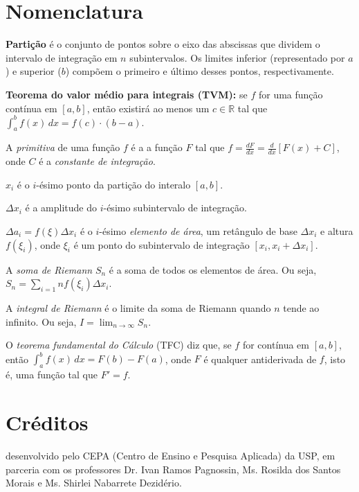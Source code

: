 \documentclass[a4paper,12pt]{scrartcl}
\begin{document}
\section*{Nomenclatura}
\begin{compactitem}
 \item {\bfseries Partição} é o conjunto de pontos sobre o eixo das abscissas que dividem o intervalo de integração em $n$ subintervalos. Os limites inferior (representado por $a$) e superior ($b$) compõem o primeiro e último desses pontos, respectivamente.
 
 \item {\bfseries Teorema do valor médio para integrais (TVM):} se $f$ for uma função contínua em $[a,b]$, então existirá ao menos um $c \in \mathbb{R}$ tal que $\int_a^b f(x)\,dx = f(c)\cdot(b-a)$.
 
 \item A \emph{primitiva} de uma função $f$ é a a função $F$ tal que $f = \frac{dF}{dx} = \frac{d}{dx}\left[F(x) + C\right]$, onde $C$ é a \emph{constante de integração}.
 
 \item $x_i$ é o $i$-ésimo ponto da partição do interalo $[a,b]$.
 
 \item $\Delta x_i$ é a amplitude do $i$-ésimo subintervalo de integração.
 
 \item $\Delta a_i = f(\xi) \Delta x_i$ é o $i$-ésimo \emph{elemento de área}, um retângulo de base $\Delta x_i$ e altura $f(\xi_i)$, onde $\xi_i$ é um ponto do subintervalo de integração $[x_i, x_i + \Delta x_i]$.
 
 \item A \emph{soma de Riemann} $S_n$ é a soma de todos os elementos de área. Ou seja, $S_n = \sum_{i=1}{n} f(\xi_i) \Delta x_i$.
 
 \item A \emph{integral de Riemann} é o limite da soma de Riemann quando $n$ tende ao infinito. Ou seja, $I = \lim_{n \to \infty} S_n$.
 
 \item O \emph{teorema fundamental do Cálculo} (TFC) diz que, se $f$ for contínua em $[a,b]$, então $\int_a^b f(x)\,dx = F(b) - F(a)$, onde $F$ é qualquer antiderivada de $f$, isto é, uma função tal que $F' = f$.
\end{compactitem}

  \section{Créditos}
  
desenvolvido pelo CEPA (Centro de Ensino e Pesquisa Aplicada) da USP, em parceria com os professores Dr. Ivan Ramos Pagnossin, Ms. Rosilda dos Santos Morais e Ms. Shirlei Nabarrete Dezidério.  
\end{document}
